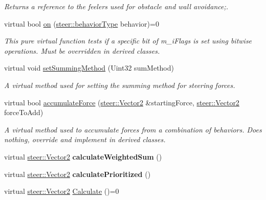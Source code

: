 \begin{DoxyCompactItemize}
\begin{DoxyCompactList}\small\item\em Returns a reference to the feelers used for obstacle and wall avoidance;. \end{DoxyCompactList}\item 
virtual bool \hyperlink{classsteer_1_1_agent_a707204e49e6519c7a8ea0f3ded608d98}{on} (\hyperlink{namespacesteer_afe6e72f8f8088962727051501181acbe}{steer\-::behavior\-Type} behavior)=0
\begin{DoxyCompactList}\small\item\em This pure virtual function tests if a specific bit of m\-\_\-i\-Flags is set using bitwise operations. Must be overridden in derived classes. \end{DoxyCompactList}\item 
virtual void \hyperlink{classsteer_1_1_agent_ab52d1f7efa08cec0dd516e33551a6a83}{set\-Summing\-Method} (Uint32 sum\-Method)
\begin{DoxyCompactList}\small\item\em A virtual method used for setting the summing method for steering forces. \end{DoxyCompactList}\item 
virtual bool \hyperlink{classsteer_1_1_agent_a00cff0b81bac1d46293d64ce1e3517af}{accumulate\-Force} (\hyperlink{structsteer_1_1_vector2}{steer\-::\-Vector2} \&starting\-Force, \hyperlink{structsteer_1_1_vector2}{steer\-::\-Vector2} force\-To\-Add)
\begin{DoxyCompactList}\small\item\em A virtual method used to accumulate forces from a combination of behaviors. Does nothing, override and implement in derived classes. \end{DoxyCompactList}\item 
\hypertarget{classsteer_1_1_agent_a5d0a4aeb34d48bd120ad68b713a44818}{virtual \hyperlink{structsteer_1_1_vector2}{steer\-::\-Vector2} {\bfseries calculate\-Weighted\-Sum} ()}\label{classsteer_1_1_agent_a5d0a4aeb34d48bd120ad68b713a44818}

\item 
\hypertarget{classsteer_1_1_agent_a127df9a02a6313414adc8aa5ffa83cc3}{virtual \hyperlink{structsteer_1_1_vector2}{steer\-::\-Vector2} {\bfseries calculate\-Prioritized} ()}\label{classsteer_1_1_agent_a127df9a02a6313414adc8aa5ffa83cc3}

\item 
\hypertarget{classsteer_1_1_agent_ac20318e22f798b3b3ec9c18608e8efbf}{virtual \hyperlink{structsteer_1_1_vector2}{steer\-::\-Vector2} \hyperlink{classsteer_1_1_agent_ac20318e22f798b3b3ec9c18608e8efbf}{Calculate} ()=0}\label{classsteer_1_1_agent_ac20318e22f798b3b3ec9c18608e8efbf}


\end{DoxyCompactItemize}
